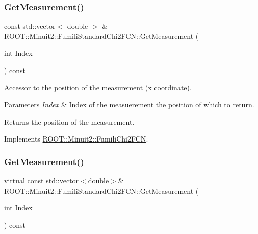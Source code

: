 \subsubsection{\texorpdfstring{GetMeasurement()}{GetMeasurement()}\hspace{0.1cm}{\footnotesize\ttfamily [1/2]}}
{\footnotesize\ttfamily const std\+::vector$<$ double $>$ \& R\+O\+O\+T\+::\+Minuit2\+::\+Fumili\+Standard\+Chi2\+F\+C\+N\+::\+Get\+Measurement (\begin{DoxyParamCaption}\item[{int}]{Index }\end{DoxyParamCaption}) const\hspace{0.3cm}{\ttfamily [virtual]}}

Accessor to the position of the measurement (x coordinate).


\begin{DoxyParams}{Parameters}
{\em Index} & Index of the measuerement the position of which to return.\\
\hline
\end{DoxyParams}
\begin{DoxyReturn}{Returns}
the position of the measurement. 
\end{DoxyReturn}


Implements \mbox{\hyperlink{classROOT_1_1Minuit2_1_1FumiliChi2FCN_a1831875c53596cd4aa52ea536de53b60}{R\+O\+O\+T\+::\+Minuit2\+::\+Fumili\+Chi2\+F\+CN}}.

\mbox{\label{classROOT_1_1Minuit2_1_1FumiliStandardChi2FCN_a3bbc9a9cb77ce45aa764aa1f6e74349c}} 
\subsubsection{\texorpdfstring{GetMeasurement()}{GetMeasurement()}\hspace{0.1cm}{\footnotesize\ttfamily [2/2]}}
{\footnotesize\ttfamily virtual const std\+::vector$<$double$>$\& R\+O\+O\+T\+::\+Minuit2\+::\+Fumili\+Standard\+Chi2\+F\+C\+N\+::\+Get\+Measurement (\begin{DoxyParamCaption}\item[{int}]{Index }\end{DoxyParamCaption}) const\hspace{0.3cm}{\ttfamily [virtual]}}

